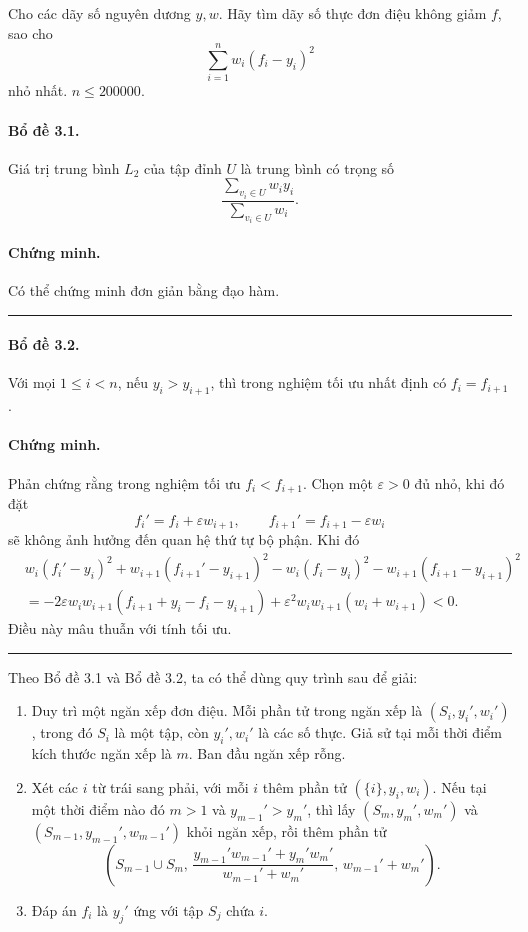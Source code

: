 \documentclass[11pt]{article}
\newcommand{\qedmark}{\hfill\rule{0.7ex}{0.7ex}}
\begin{document}
Cho các dãy số nguyên dương \(y,w\). Hãy tìm dãy số thực đơn điệu không giảm
\(f\), sao cho
\[
  \sum_{i=1}^{n} w_i(f_i-y_i)^2
\]
nhỏ nhất. \(n\le 200000\).

\paragraph{Bổ đề 3.1.}
Giá trị trung bình \(L_2\) của tập đỉnh \(U\) là trung bình có trọng số
\[
  \frac{\sum_{v_i\in U} w_i y_i}{\sum_{v_i\in U} w_i}.
\]

\paragraph{Chứng minh.}
Có thể chứng minh đơn giản bằng đạo hàm. \qedmark

\paragraph{Bổ đề 3.2.}
Với mọi \(1\le i<n\), nếu \(y_i>y_{i+1}\), thì trong nghiệm tối ưu nhất định có
\(f_i=f_{i+1}\).

\paragraph{Chứng minh.}
Phản chứng rằng trong nghiệm tối ưu \(f_i<f_{i+1}\). Chọn một
\(\varepsilon>0\) đủ nhỏ, khi đó đặt
\[
  f_i'=f_i+\varepsilon w_{i+1},\qquad
  f_{i+1}'=f_{i+1}-\varepsilon w_i
\]
sẽ không ảnh hưởng đến quan hệ thứ tự bộ phận. Khi đó
\[
\begin{aligned}
&w_i(f_i'-y_i)^2+w_{i+1}(f_{i+1}'-y_{i+1})^2
  -w_i(f_i-y_i)^2-w_{i+1}(f_{i+1}-y_{i+1})^2\\
&= -2\varepsilon w_iw_{i+1}(f_{i+1}+y_i-f_i-y_{i+1})
  +\varepsilon^2w_iw_{i+1}(w_i+w_{i+1}) < 0.
\end{aligned}
\]
Điều này mâu thuẫn với tính tối ưu. \qedmark

Theo Bổ đề 3.1 và Bổ đề 3.2, ta có thể dùng quy trình sau để giải:
\begin{enumerate}
  \item Duy trì một ngăn xếp đơn điệu. Mỗi phần tử trong ngăn xếp là
  \((S_i,y_i',w_i')\), trong đó \(S_i\) là một tập, còn \(y_i',w_i'\) là các số
  thực. Giả sử tại mỗi thời điểm kích thước ngăn xếp là \(m\). Ban đầu ngăn xếp
  rỗng.
  \item Xét các \(i\) từ trái sang phải, với mỗi \(i\) thêm phần tử
  \((\{i\},y_i,w_i)\). Nếu tại một thời điểm nào đó
  \(m>1\) và \(y_{m-1}'>y_m'\), thì lấy
  \((S_m,y_m',w_m')\) và \((S_{m-1},y_{m-1}',w_{m-1}')\) khỏi ngăn xếp, rồi thêm
  phần tử
  \[
    \left(S_{m-1}\cup S_m,\,
    \frac{y_{m-1}'w_{m-1}'+y_m'w_m'}{w_{m-1}'+w_m'},\,
    w_{m-1}'+w_m'\right).
  \]
  \item Đáp án \(f_i\) là \(y_j'\) ứng với tập \(S_j\) chứa \(i\).
\end{enumerate}
\end{document}

